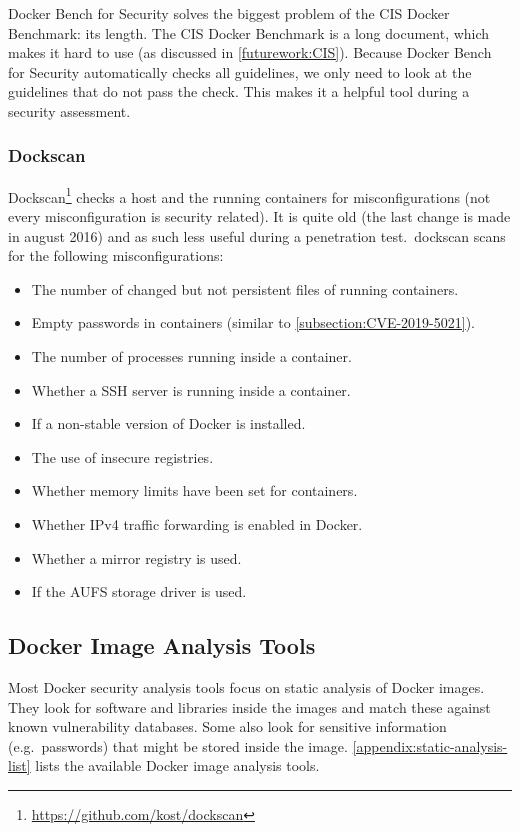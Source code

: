 \medskip

Docker Bench for Security solves the biggest problem of the CIS Docker Benchmark: its length. The CIS Docker Benchmark is a long document, which makes it hard to use (as discussed in \autoref{futurework:CIS}). Because Docker Bench for Security automatically checks all guidelines, we only need to look at the guidelines that do not pass the check. This makes it a helpful tool during a security assessment.

\subsubsection{Dockscan}
Dockscan\footnote{\url{https://github.com/kost/dockscan}} checks a host and the running containers for misconfigurations (not every misconfiguration is security related). It is quite old (the last change is made in august 2016) and as such less useful during a penetration test.\ dockscan scans for the following misconfigurations:
\begin{itemize}
    \item The number of changed but not persistent files of running containers.
    \item Empty passwords in containers (similar to \autoref{subsection:CVE-2019-5021}).
    \item The number of processes running inside a container.
    \item Whether a SSH server is running inside a container.
    \item If a non-stable version of Docker is installed.
    \item The use of insecure registries.
    \item Whether memory limits have been set for containers.
    \item Whether IPv4 traffic forwarding is enabled in Docker.
    \item Whether a mirror registry is used.
    \item If the AUFS storage driver is used.
\end{itemize}

\subsection{Docker Image Analysis Tools}\label{subsection:image-analysis-tools}
Most Docker security analysis tools focus on static analysis of Docker images. They look for software and libraries inside the images and match these against known vulnerability databases. Some also look for sensitive information (e.g.\ passwords) that might be stored inside the image. \autoref{appendix:static-analysis-list} lists the available Docker image analysis tools.


